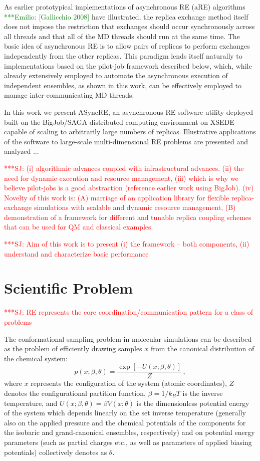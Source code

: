 \documentclass{sig-alternate}
\newcommand{\jhanote}[1]{ {\textcolor{red} { ***SJ: #1 }}}
\newcommand{\egnote}[1]{ {\textcolor{green} { ***Emilio: #1 }}}
\newcommand{\jhanote}[1]{}
\begin{document}
As earlier prototypical implementations of asynchronous RE (aRE)
algorithms \egnote{[Gallicchio 2008]} have illustrated, the replica
exchange method itself does not impose the restriction that exchanges
should occur synchronously across all threads and that all of the MD
threads should run at the same time. The basic idea of asynchronous
RE is to allow pairs of replicas to perform exchanges independently
from the other replicas. This paradigm lends itself naturally to
implementations based on the pilot-job framework described below,
which, while already extensively employed to automate the asynchronous
execution of independent ensembles, as shown in this work, can be
effectively employed to manage inter-communicating MD threads.

In this work we present ASyncRE, an asynchronous RE software utility
deployed built on the BigJob/SAGA distributed computing environment on
XSEDE capable of scaling to arbitrarily large numbers of
replicas. Illustrative applications of the software to large-scale
multi-dimensional RE problems are presented and analyzed ...

\jhanote{(i) algorithmic advances coupled with infrastructural
  advances. (ii) the need for dynamic execution and resource
  management, (iii) which is why we believe pilot-jobs is a good
  abstraction (reference earlier work using BigJob). (iv) Novelty of
  this work is: (A) marriage of an application library for flexible
  replica-exchange simulations with scalable and dynamic resource
  management, (B) demonstration of a framework for different and
  tunable replica coupling schemes that can be used for QM and
  classical examples.}
 
\jhanote{Aim of this work is to present (i) the framework -- both
  components, (ii) understand and characterize basic performance}


\section{Scientific Problem}\label{sec:requirements}

\jhanote{RE represents the core coordination/communication pattern for
  a class of problems} 

The conformational sampling problem in molecular simulations can be
described as the problem of efficiently drawing samples $x$ from the
canonical distribution of the chemical system:
\begin{equation}
p(x;\beta,\theta) = \frac{\exp[-U(x;\beta,\theta)]}{Z} \, ,
\end{equation}
where $x$ represents the configuration of the system (atomic
coordinates), $Z$ denotes the configurational partition function,
$\beta=1/k_B T$ is the inverse temperature, and
$U(x;\beta,\theta)=\beta V(x;\theta)$ is the dimensionless potential
energy of the system which depends linearly on the set inverse temperature
(generally also on the applied pressure and the chemical potentials of
the components for the isobaric and grand-canonical ensembles,
respectively) and on potential energy parameters (such as partial
charges etc., as well as parameters of applied biasing potentials)
collectively denotes as $\theta$.
\end{document}
